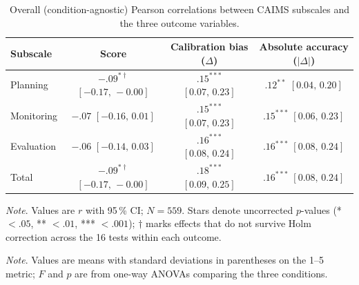 \documentclass[manuscript, anonymous=false,authorversion,review=false]{acmart}
\begin{document}
\begin{table}[!htp]
\centering
\caption{Overall (condition-agnostic) Pearson correlations between
CAIMS subscales and the three outcome variables.} 
\label{tab:caims-overall}
\begin{tabular}{lccc}
\hline Subscale     & Score                                & Calibration bias ($\Delta$)             & Absolute accuracy ($|\Delta|$)        \\ \hline
Planning             & $-.09^{*\dagger}$ $[-0.17,\,-0.00]$  & $.15^{***}$ $[0.07,\,0.23]$            & $.12^{**}$ $[0.04,\,0.20]$            \\
Monitoring           & $-.07$ $[-0.16,\,0.01]$              & $.15^{***}$ $[0.07,\,0.23]$            & $.15^{***}$ $[0.06,\,0.23]$           \\
Evaluation           & $-.06$ $[-0.14,\,0.03]$              & $.16^{***}$ $[0.08,\,0.24]$            & $.16^{***}$ $[0.08,\,0.24]$           \\
Total                & $-.09^{*\dagger}$ $[-0.17,\,-0.00]$  & $.18^{***}$ $[0.09,\,0.25]$            & $.16^{***}$ $[0.08,\,0.24]$           \\
\hline
\end{tabular}

\raggedright \small \textit{Note}. Values are $r$ with 95\,\% CI; $N = 559$. Stars denote uncorrected $p$-values (* $<.05$, ** $<.01$, *** $<.001$); $\dagger$ marks effects that do not survive Holm correction across the 16 tests within each outcome.

\end{table}

\begin{table}[!htp]
\centering
\caption{CAIMS subscale and total descriptives by condition. }
\label{tab:caims-means}

\raggedright \small \textit{Note}. Values
are means with standard deviations in parentheses on the 1--5 metric;
$F$ and $p$ are from one-way ANOVAs comparing the three
conditions.

\end{table}
\end{document}
